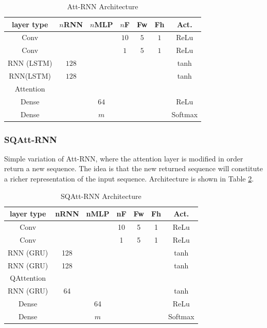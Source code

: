 \begin{table}[h]
	\caption{Att-RNN Architecture}
	\label{tab:attrnn_architecture}
	\begin{tabular}{|c|c|c|c|c|c|c|}
	\hline
	layer type & $n$RNN & $n$MLP & $n$F & Fw & Fh & Act.    \\ \hline
	Conv       &      &      & $10$ & $5$  & $1$  & ReLu    \\ \hline
	Conv       &      &      & $1$  & $5$  & $1$  & ReLu    \\ \hline
	RNN (LSTM) & $128$  &      &    &    &    & tanh    \\ \hline
	RNN(LSTM)  & $128$  &      &    &    &    & tanh    \\ \hline
	Attention  &      &      &    &    &    &         \\ \hline
	Dense      &      & $64$   &    &    &    & ReLu    \\ \hline
	Dense      &      & $m$  &    &    &    & Softmax \\ \hline
\end{tabular}
\end{table}

\subsubsection{\textbf{SQAtt-RNN}}
Simple variation of Att-RNN, where the attention layer is modified in order return a new sequence. The idea is that the new returned sequence will constitute a richer representation of the input sequence. Architecture is shown in Table \ref{tab:sqattrnn_architecture}.

\begin{table}[h]
		\caption{SQAtt-RNN Architecture}
	\label{tab:sqattrnn_architecture}
	\begin{tabular}{|c|c|c|c|c|c|c|}
		\hline
		layer type & nRNN & nMLP & nF & Fw & Fh & Act.    \\ \hline
		Conv       &      &      & 10 & 5  & 1  & ReLu    \\ \hline
		Conv       &      &      & 1  & 5  & 1  & ReLu    \\ \hline
		RNN (GRU)  & 128  &      &    &    &    & tanh    \\ \hline
		RNN (GRU)  & 128  &      &    &    &    & tanh    \\ \hline
		QAttention &      &      &    &    &    &         \\ \hline
		RNN (GRU)  & 64   &      &    &    &    & tanh    \\ \hline
		Dense      &      & 64   &    &    &    & ReLu    \\ \hline
		Dense      &      & $m$  &    &    &    & Softmax \\ \hline
	\end{tabular}
\end{table}


